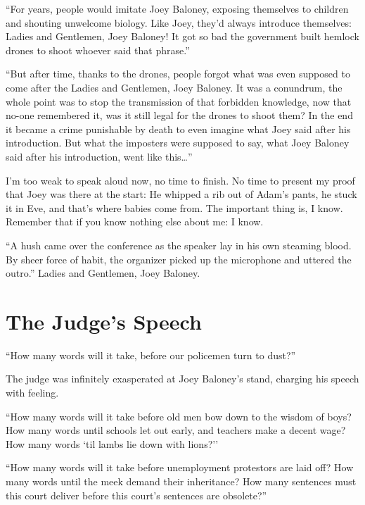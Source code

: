 \documentclass[oneside]{book}
\begin{document}
``For years, people would imitate Joey Baloney, exposing themselves to children
and shouting unwelcome biology.  Like Joey, they'd always introduce themselves:
Ladies and Gentlemen, Joey Baloney!  It got so bad the government built
hemlock drones to shoot whoever said that phrase.''

``But after time, thanks to the drones, people forgot what was even supposed to come
after the Ladies and Gentlemen, Joey Baloney.  It was a conundrum, the
whole point was to stop the transmission of that forbidden knowledge,
now that no-one remembered it, was it still legal for the drones to shoot them?
In the end it became a crime punishable by death to even imagine what Joey
said after his introduction.
But what the imposters were supposed to say, what Joey Baloney said after his
introduction, went like this\ldots''

I'm too weak to speak aloud now, no time to finish.
No time to present my proof that Joey was there at the start:
He whipped a rib out of Adam's pants, he stuck it in Eve, and that's where
babies come from.  The important thing is, I know.
Remember that if you know nothing else about me: I know.

``A hush came over the conference as the speaker lay in his own steaming blood.
By sheer force of habit, the organizer picked up the microphone and uttered the
outro.''  Ladies and Gentlemen, Joey Baloney.


\chapter{The Judge's Speech}

``How many words will it take, before our policemen turn to dust?''

The judge was infinitely exasperated at Joey Baloney's stand,
charging his speech with feeling.

``How many words will it take before old men bow down to the wisdom
of boys?
How many words until schools let out early, and teachers make a decent wage?
How many words `til lambs lie down with lions?''


``How many words will it take
before unemployment protestors are laid off?
How many words until the meek demand their inheritance?
How many sentences must this court deliver before this court's sentences are obsolete?''
\end{document}
